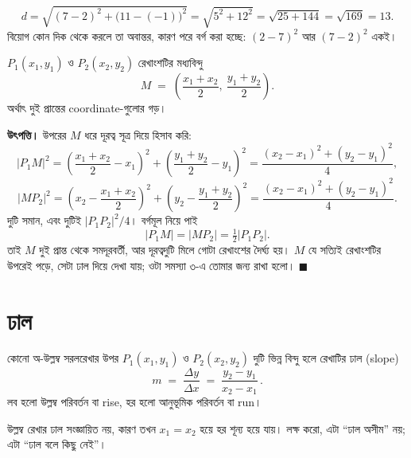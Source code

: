 \documentclass[11pt]{article}
\begin{document}
\begin{solbox}
\[
  d = \sqrt{(7-2)^2 + \big(11 - (-1)\big)^2} = \sqrt{5^2 + 12^2}
    = \sqrt{25 + 144} = \sqrt{169} = 13 .
\]
বিয়োগ কোন দিক থেকে করলে তা অবান্তর, কারণ পরে বর্গ করা হচ্ছে:
$(2-7)^2$ আর $(7-2)^2$ একই।
\end{solbox}

\begin{idea}[মধ্যবিন্দু]
$P_1(x_1, y_1)$ ও $P_2(x_2, y_2)$ রেখাংশটির মধ্যবিন্দু
\[
  M \;=\; \left( \frac{x_1 + x_2}{2},\ \frac{y_1 + y_2}{2} \right).
\]
অর্থাৎ দুই প্রান্তের coordinate-গুলোর গড়।
\end{idea}

\noindent
\textbf{উৎপত্তি।} উপরের $M$ ধরে দূরত্ব সূত্র দিয়ে হিসাব করি:
\[
  |P_1 M|^2 = \left( \frac{x_1+x_2}{2} - x_1 \right)^2
            + \left( \frac{y_1+y_2}{2} - y_1 \right)^2
            = \frac{(x_2-x_1)^2 + (y_2-y_1)^2}{4} ,
\]
\[
  |M P_2|^2 = \left( x_2 - \frac{x_1+x_2}{2} \right)^2
            + \left( y_2 - \frac{y_1+y_2}{2} \right)^2
            = \frac{(x_2-x_1)^2 + (y_2-y_1)^2}{4} .
\]
দুটি সমান, এবং দুটিই $|P_1P_2|^2 / 4$। বর্গমূল নিয়ে পাই
\[
  |P_1 M| = |M P_2| = \tfrac{1}{2} |P_1 P_2| .
\]
তাই $M$ দুই প্রান্ত থেকে সমদূরবর্তী, আর দূরত্বদুটি মিলে গোটা রেখাংশের দৈর্ঘ্য
হয়। $M$ যে সত্যিই রেখাংশটির উপরেই পড়ে, সেটা ঢাল দিয়ে দেখা যায়; ওটা সমস্যা ৩-এ
তোমার জন্য রাখা হলো। $\blacksquare$

\section{ঢাল}

\begin{idea}[ঢাল]
কোনো অ-উল্লম্ব সরলরেখার উপর $P_1(x_1, y_1)$ ও $P_2(x_2, y_2)$ দুটি ভিন্ন
বিন্দু হলে রেখাটির ঢাল (slope)
\[
  m \;=\; \frac{\Delta y}{\Delta x} \;=\; \frac{y_2 - y_1}{x_2 - x_1}\,.
\]
লব হলো উল্লম্ব পরিবর্তন বা rise, হর হলো আনুভূমিক পরিবর্তন বা run।

উল্লম্ব রেখার ঢাল সংজ্ঞায়িত নয়, কারণ তখন $x_1 = x_2$ হয়ে হর শূন্য হয়ে যায়।
লক্ষ করো, এটা ``ঢাল অসীম'' নয়; এটা ``ঢাল বলে কিছু নেই''।
\end{idea}

\begin{center}
\end{center}
\end{document}
